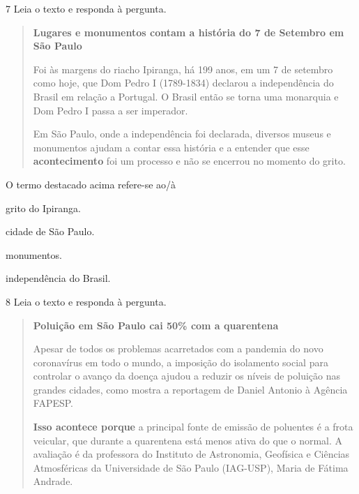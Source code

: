 \num{7} Leia o texto e responda à pergunta.

\begin{quote}
\textbf{Lugares e monumentos contam a história do 7 de Setembro em São
Paulo}

Foi às margens do riacho Ipiranga, há 199 anos, em um 7 de setembro como
hoje, que Dom Pedro I (1789-1834) declarou a independência do Brasil em
relação a Portugal. O Brasil então se torna uma monarquia e Dom Pedro I
passa a ser imperador.

Em São Paulo, onde a independência foi declarada, diversos museus e
monumentos ajudam a contar essa história e a entender que esse
\textbf{acontecimento} foi um processo e não se encerrou no momento do
grito.
\end{quote}


O termo destacado acima refere-se ao/à

\begin{escolha}
  \item grito do Ipiranga.

  \item cidade de São Paulo.

  \item monumentos.

  \item independência do Brasil.
\end{escolha}

\num{8} Leia o texto e responda à pergunta.

\begin{quote}
\textbf{Poluição em São Paulo cai 50\% com a quarentena}

Apesar de todos os problemas acarretados com a pandemia do novo
coronavírus em todo o mundo, a imposição do isolamento social para
controlar o avanço da doença ajudou a reduzir os níveis de poluição nas
grandes cidades, como mostra a reportagem de Daniel Antonio à Agência
FAPESP.

\textbf{Isso acontece porque} a principal fonte de emissão de poluentes é a
frota veicular, que durante a quarentena está menos ativa do que o
normal. A avaliação é da professora do Instituto de Astronomia,
Geofísica e Ciências Atmosféricas da Universidade de São Paulo
(IAG-USP), Maria de Fátima Andrade.
\end{quote}

